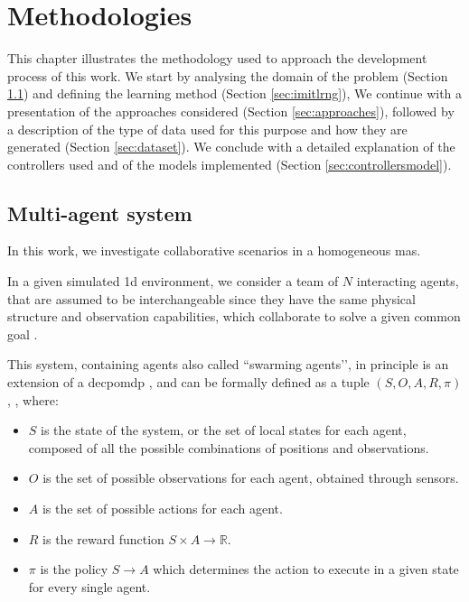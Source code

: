 \chapter{Methodologies}
\label{chap:methods}

This chapter illustrates the methodology used to approach the development 
process of this work. 
We start by analysing the domain of the problem (Section \ref{sec:MAS}) and 
defining the learning method (Section \ref{sec:imitlrng}), 
We continue with a presentation of the approaches considered (Section 
\ref{sec:approaches}), followed by  a description of the type of data used for this 
purpose and how they are generated (Section \ref{sec:dataset}).
We conclude with a detailed explanation of the controllers used and of the models
implemented (Section \ref{sec:controllersmodel}). 


\section{Multi-agent system}
\label{sec:MAS}

In this work, we investigate collaborative scenarios in a homogeneous \gls{mas}.

In a given simulated \gls{1d} environment, we consider a team of $N$ interacting 
agents, that are assumed to be interchangeable since they have the same physical 
structure and observation capabilities, which collaborate to solve a given common 
goal \cite[][]{stone2000multiagent, vsovsic2016inverse}.

This system, containing agents also called ``swarming agents’’, in principle is an 
extension of a \gls{decpomdp} \cite[][]{oliehoek2012decentralised}, and can be 
formally defined as a tuple $(S, O, A, R, \pi)$, \cite[][]{schaal1999imitation}, 
where:
\begin{itemize}
	\item $S$ is the state of the system, or the set of local states for each agent, 
	composed of all the possible combinations of positions and observations.
	\item $O$ is the set of possible observations for each agent, obtained through 
	sensors.
	\item $A$ is the set of possible actions for each agent.
	\item $R$ is the reward function $S \times A \rightarrow \mathbb{R}$.
	\item $\pi$ is the policy $S \rightarrow A$ which determines the action to 
	execute in a given state for every single agent.
\end{itemize}

